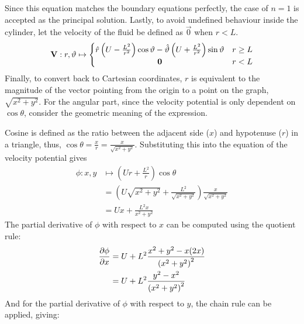 Since this equation matches the boundary equations perfectly, the case of $n=1$ is accepted as the principal solution. Lastly, to avoid undefined behaviour inside the cylinder, let the velocity of the fluid be defined as $\vec{0}$ when $r<L$.
$$
    \mathbf{V}:r,\vartheta\mapsto\left\{\begin{matrix}
        \hat{r}\left(U-\frac{L^2}{r^{2}}\right)\cos\vartheta-\hat{\vartheta}\left(U+\frac{L^2}{r^{2}}\right)\sin\vartheta&r\geq L\\
        \mathbf{0}&r<L
    \end{matrix}\right.
$$
Finally, to convert back to Cartesian coordinates, $r$ is equivalent to the magnitude of the vector pointing from the origin to a point on the graph, $\sqrt{x^2+y^2}$. For the angular part, since the velocity potential is only dependent
on $\cos\theta$, consider the geometric meaning of the expression. 
\begin{center}        
\end{center}
Cosine is defined as the ratio between the adjacent side ($x$) and hypotenuse ($r$) in a triangle, thus, $\cos\theta=\frac{x}{r}=\frac{x}{\sqrt{x^2+y^2}}$. Substituting this into the equation of the velocity potential gives
\begin{align*}
    \phi:x,y&\mapsto\left(Ur+\frac{L^2}{r}\right)\cos\theta\\
    &=\left(U\sqrt{x^2+y^2}+\frac{L^2}{\sqrt{x^2+y^2}}\right)\frac{x}{\sqrt{x^2+y^2}}\\
    &=Ux+\frac{L^2x}{x^2+y^2}
\end{align*}
The partial derivative of $\phi$ with respect to $x$ can be computed using the quotient rule:
\begin{align*}
    \pdv{\phi}{x}&=U+L^2\frac{x^2+y^2-x(2x)}{\left(x^2+y^2\right)^2}\\
    &=U+L^2\frac{y^2-x^2}{\left(x^2+y^2\right)^2}
\end{align*}
And for the partial derivative of $\phi$ with respect to $y$, the chain rule can be applied, giving:
